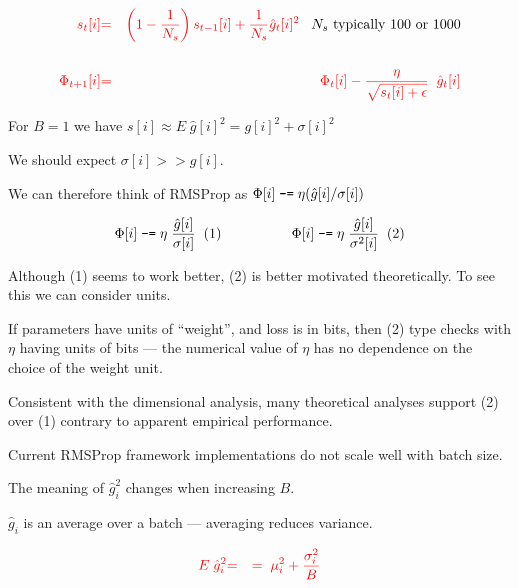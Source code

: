 {
\begin{eqnarray*}
{\color{red} s_t[i]} & {\color{red} =} & {\color{red} \left(1-\frac{1}{N_s}\right) s_{t-1}[i] + \frac{1}{N_s} \hat{g}_t[i]^2}\;\;\;\mbox{$N_s$ typically 100 or 1000} \\
\\
{\color{red} \Phi_{t+1}[i]} & {\color{red} =} & {\color{red} \Phi_t[i] - \frac{\eta}{\sqrt{s_t[i] + \epsilon}}\;\; \hat{g}_t[i]}
\end{eqnarray*}

\vfill
For $B = 1$ we have $s[i] \approx E\;\hat{g}[i]^2  =  g[i]^2 + \sigma[i]^2$

\vfill
We should expect $\sigma[i] >> g[i]$.

\vfill
We can therefore think of RMSProp as {\color{red} $\Phi[i] \;\mbox{\tt -=}\; \eta(\hat{g}[i]/\sigma[i])$}


{\color{red} $$\Phi[i] \;\mbox{\tt -=} \; \eta\;\frac{\hat{g}[i]}{\sigma[i]}\;\;(1)\hspace{5em}\Phi[i] \;\mbox{\tt -=} \; \eta\;\frac{\hat{g}[i]}{\sigma^2[i]}\;\;(2)$$}

\vfill
Although (1) seems to work better, (2) is better motivated theoretically.  To see this we can consider units.

\vfill
If parameters have units of ``weight'', and loss is in bits, then (2) type checks with $\eta$ having units of bits --- the numerical value of $\eta$
has no dependence on the choice of the weight unit.

\vfill
Consistent with the dimensional analysis, many theoretical analyses support (2) over (1) contrary to apparent empirical performance.


Current RMSProp framework implementations do not scale well with batch size.

\vfill
The meaning of  $\hat{g}_i^2$ changes when increasing $B$.

\vfill
$\hat{g}_i$ is an average over a batch --- averaging reduces variance.

\begin{eqnarray*}
{\color{red} E\; \hat{g}_i^2} & {\color{red} =} & {\color{red} = \; \mu_i^2 + \frac{\sigma_i^2}{B}}
\end{eqnarray*}



}
